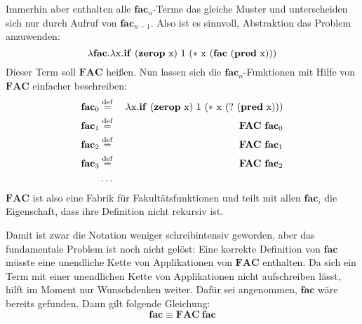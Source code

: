 Immerhin aber enthalten alle $\mathbf{fac}_n$-Terme das
gleiche Muster und unterscheiden sich nur durch Aufruf von
$\mathbf{fac}_{n-1}$.  Also ist es sinnvoll, Abstraktion
das Problem anzuwenden:
%
\begin{displaymath}
  \lambda\mathbf{fac}.\lambda \mathrm x.\mathbf{if}~(\mathbf{zerop}~\mathrm x)~1~(\ast~\mathrm x~(\mathbf{fac}~(\mathbf{pred}~\mathrm x)))
\end{displaymath}
%
Dieser Term soll $\mathbf{FAC}$ heißen.  Nun lassen sich die
$\mathbf{fac}_n$-Funktionen mit Hilfe von $\mathbf{FAC}$ einfacher beschreiben:
%
\begin{eqnarray*}
   \mathbf{fac}_0 &\stackrel{\rm def}{=}{}& \lambda \mathrm x.\mathbf{if}~(\mathbf{zerop}~\mathrm x)~1~(\ast~\mathrm x~(?~(\mathbf{pred}~\mathrm x)))\\
   \mathbf{fac}_1 &\stackrel{\rm def}{=}{}& \mathbf{FAC}~\mathbf{fac}_0\\
   \mathbf{fac}_2 &\stackrel{\rm def}{=}{}& \mathbf{FAC}~\mathbf{fac}_1\\
   \mathbf{fac}_3 &\stackrel{\rm def}{=}{}& \mathbf{FAC}~\mathbf{fac}_2\\
   &\ldots&
\end{eqnarray*}
%
$\mathbf{FAC}$ ist also eine Fabrik für Fakultätsfunktionen und
teilt mit allen $\mathbf{fac}_i$ die Eigenschaft, dass ihre
Definition nicht rekursiv ist.

Damit ist zwar die Notation weniger schreibintensiv geworden,
aber das fundamentale Problem ist noch nicht gelöst: Eine korrekte
Definition von $\mathbf{fac}$ müsste eine unendliche
Kette von Applikationen von $\mathbf{FAC}$ enthalten.
Da sich ein Term mit einer unendlichen Kette von Applikationen nicht aufschreiben lässt, hilft im Moment nur Wunschdenken weiter.
Dafür sei angenommen, $\mathbf{fac}$ wäre bereits gefunden.  Dann gilt folgende
Gleichung:
%
\begin{displaymath}
  \mathbf{fac} \equiv \mathbf{FAC}~\mathbf{fac}
\end{displaymath}

